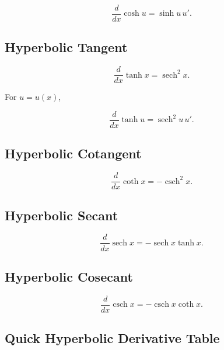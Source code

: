 \[
\boxed{
\frac{d}{dx}\cosh u
=
\sinh u\,u'.
}
\]

\subsection{Hyperbolic Tangent}
\label{subsec:tanh-derivative-reference}

\[
\boxed{
\frac{d}{dx}\tanh x
=
\operatorname{sech}^2x.
}
\]

For \(u=u(x)\),

\[
\boxed{
\frac{d}{dx}\tanh u
=
\operatorname{sech}^2u\,u'.
}
\]

\subsection{Hyperbolic Cotangent}
\label{subsec:coth-derivative-reference}

\[
\boxed{
\frac{d}{dx}\coth x
=
-\operatorname{csch}^2x.
}
\]

\subsection{Hyperbolic Secant}
\label{subsec:sech-derivative-reference}

\[
\boxed{
\frac{d}{dx}\operatorname{sech}x
=
-\operatorname{sech}x\tanh x.
}
\]

\subsection{Hyperbolic Cosecant}
\label{subsec:csch-derivative-reference}

\[
\boxed{
\frac{d}{dx}\operatorname{csch}x
=
-\operatorname{csch}x\coth x.
}
\]

\subsection{Quick Hyperbolic Derivative Table}
\label{subsec:quick-hyperbolic-derivative-table}

